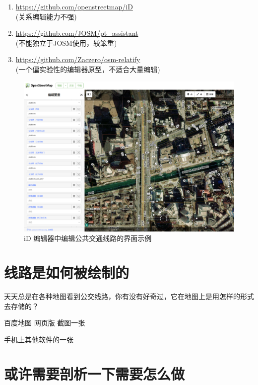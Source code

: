 \documentclass{beamer}
\begin{document}
\begin{frame}
    \begin{enumerate}
        \item \url{https://github.com/openstreetmap/iD} \\
        (关系编辑能力不强)
        \item \url{https://github.com/JOSM/pt_assistant} \\
        (不能独立于JOSM使用，较笨重)
        \item \url{https://github.com/Zaczero/osm-relatify} \\
        (一个偏实验性的编辑器原型，不适合大量编辑)
    \end{enumerate}
    \begin{figure}[htpb]
        \centering
        \includegraphics[width=0.2\linewidth]{figure/editor-iD.png}
        \caption{iD 编辑器中编辑公共交通线路的界面示例}
    \end{figure}
\end{frame}

\section{线路是如何被绘制的}

\begin{frame}
    \LARGE
    天天总是在各种地图看到公交线路，你有没有好奇过，它在地图上是用怎样的形式去存储的？
\end{frame}

\begin{frame}

    百度地图 网页版 截图一张

    手机上其他软件的一张
\end{frame}




\section{或许需要剖析一下需要怎么做}
\end{document}
